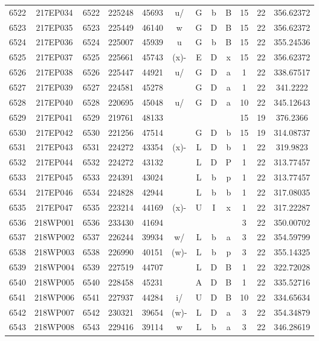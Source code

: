 \begin{tabular}{|*{12}{c|}}
6522 & 217EP034 & 6522 & 225248 & 45693 & u/ & G & b & B & 15 & 22 & 356.62372 \\ 
6523 & 217EP035 & 6523 & 225449 & 46140 & w & G & D & B & 15 & 22 & 356.62372 \\ 
6524 & 217EP036 & 6524 & 225007 & 45939 & u & G & b & B & 15 & 22 & 355.24536 \\ 
6525 & 217EP037 & 6525 & 225661 & 45743 & (x)- & E & D & x & 15 & 22 & 356.62372 \\ 
6526 & 217EP038 & 6526 & 225447 & 44921 & u/ & G & D & a & 1 & 22 & 338.67517 \\ 
6527 & 217EP039 & 6527 & 224581 & 45278 &  & G & D & a & 1 & 22 & 341.2222 \\ 
6528 & 217EP040 & 6528 & 220695 & 45048 & u/ & G & D & a & 10 & 22 & 345.12643 \\ 
6529 & 217EP041 & 6529 & 219761 & 48133 &  &  &  &  & 15 & 19 & 376.2366 \\ 
6530 & 217EP042 & 6530 & 221256 & 47514 &  & G & D & b & 15 & 19 & 314.08737 \\ 
6531 & 217EP043 & 6531 & 224272 & 43354 & (x)- & L & D & b & 1 & 22 & 319.9823 \\ 
6532 & 217EP044 & 6532 & 224272 & 43132 &  & L & D & P & 1 & 22 & 313.77457 \\ 
6533 & 217EP045 & 6533 & 224391 & 43024 &  & L & b & p & 1 & 22 & 313.77457 \\ 
6534 & 217EP046 & 6534 & 224828 & 42944 &  & L & b & b & 1 & 22 & 317.08035 \\ 
6535 & 217EP047 & 6535 & 223214 & 44169 & (x)- & U & I & x & 1 & 22 & 317.22287 \\ 
6536 & 218WP001 & 6536 & 233430 & 41694 &  &  &  &  & 3 & 22 & 350.00702 \\ 
6537 & 218WP002 & 6537 & 226244 & 39934 & w/ & L & b & a & 3 & 22 & 354.59799 \\ 
6538 & 218WP003 & 6538 & 226990 & 40151 & (w)- & L & b & p & 3 & 22 & 355.14325 \\ 
6539 & 218WP004 & 6539 & 227519 & 44707 &  & L & D & B & 1 & 22 & 322.72028 \\ 
6540 & 218WP005 & 6540 & 228458 & 45231 &  & A & D & B & 1 & 22 & 335.52716 \\ 
6541 & 218WP006 & 6541 & 227937 & 44284 & i/ & U & D & B & 10 & 22 & 334.65634 \\ 
6542 & 218WP007 & 6542 & 230321 & 39654 & (w)- & L & D & a & 3 & 22 & 354.34879 \\ 
6543 & 218WP008 & 6543 & 229416 & 39114 & w & L & b & a & 3 & 22 & 346.28619 \\ 

\end{tabular}
